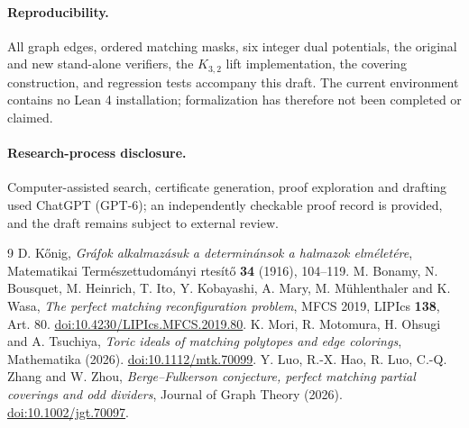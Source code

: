 \documentclass[11pt]{article}
\begin{document}
\paragraph{Reproducibility.} All graph edges, ordered matching masks,
six integer dual potentials, the original and new stand-alone
verifiers, the
$K_{3,2}$ lift implementation, the covering construction, and
regression tests accompany this draft. The current environment
contains no Lean 4 installation; formalization has therefore
not been completed or claimed.

\paragraph{Research-process disclosure.} Computer-assisted search,
certificate generation, proof exploration and drafting used
ChatGPT (GPT-6); an independently checkable proof record is
provided, and the draft remains subject to external review.

\begin{thebibliography}{9}
 D. K\H onig, \emph{Gr\'afok  alkalmaz\'asuk a determin\'ansok  a halmazok elm\'elet\'ere},
Matematikai  Term\'eszettudom\'anyi rtes\'it\H o \textbf{34} (1916), 104--119.
 M. Bonamy, N. Bousquet, M. Heinrich,
T. Ito, Y. Kobayashi, A. Mary, M. M\"uhlenthaler and K. Wasa,
\emph{The perfect matching reconfiguration problem},
MFCS 2019, LIPIcs \textbf{138}, Art. 80.
\href{https://doi.org/10.4230/LIPIcs.MFCS.2019.80}{doi:10.4230/LIPIcs.MFCS.2019.80}.
 K. Mori, R. Motomura, H. Ohsugi and A. Tsuchiya,
\emph{Toric ideals of matching polytopes and edge colorings},
Mathematika (2026).
\href{https://doi.org/10.1112/mtk.70099}{doi:10.1112/mtk.70099}.
 Y. Luo, R.-X. Hao, R. Luo, C.-Q. Zhang and W. Zhou,
\emph{Berge--Fulkerson conjecture, perfect matching partial coverings and odd dividers},
Journal of Graph Theory (2026).
\href{https://doi.org/10.1002/jgt.70097}{doi:10.1002/jgt.70097}.
\end{thebibliography}
\end{document}
